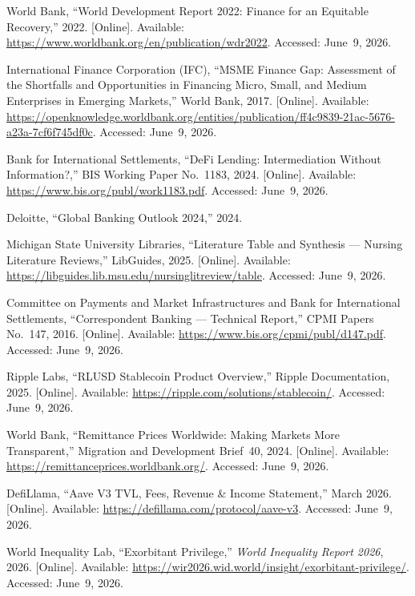 \documentclass[12pt,a4paper]{report}
\begin{document}
{\begin{enumerate}[label={[\arabic*]}]
\item World Bank, ``World Development Report 2022: Finance for an Equitable Recovery,'' 2022. [Online]. Available: \url{https://www.worldbank.org/en/publication/wdr2022}. Accessed: June~9, 2026.

\item International Finance Corporation (IFC), ``MSME Finance Gap: Assessment of the Shortfalls and Opportunities in Financing Micro, Small, and Medium Enterprises in Emerging Markets,'' World Bank, 2017. [Online]. Available: \url{https://openknowledge.worldbank.org/entities/publication/ff4c9839-21ac-5676-a23a-7cf6f745df0c}. Accessed: June~9, 2026.
\item Bank for International Settlements, ``DeFi Lending: Intermediation Without Information?,'' BIS Working Paper No.~1183, 2024. [Online]. Available: \url{https://www.bis.org/publ/work1183.pdf}. Accessed: June~9, 2026.

\item Deloitte, ``Global Banking Outlook 2024,'' 2024.

\item Michigan State University Libraries, ``Literature Table and Synthesis --- Nursing Literature Reviews,'' LibGuides, 2025. [Online]. Available: \url{https://libguides.lib.msu.edu/nursinglitreview/table}. Accessed: June~9, 2026.

\item Committee on Payments and Market Infrastructures and Bank for International Settlements, ``Correspondent Banking --- Technical Report,'' CPMI Papers No.~147, 2016. [Online]. Available: \url{https://www.bis.org/cpmi/publ/d147.pdf}. Accessed: June~9, 2026.

\item Ripple Labs, ``RLUSD Stablecoin Product Overview,'' Ripple Documentation, 2025. [Online]. Available: \url{https://ripple.com/solutions/stablecoin/}. Accessed: June~9, 2026.
\item World Bank, ``Remittance Prices Worldwide: Making Markets More Transparent,'' Migration and Development Brief~40, 2024. [Online]. Available: \url{https://remittanceprices.worldbank.org/}. Accessed: June~9, 2026.

\item DefiLlama, ``Aave V3 TVL, Fees, Revenue \& Income Statement,'' March 2026. [Online]. Available: \url{https://defillama.com/protocol/aave-v3}. Accessed: June~9, 2026.

\item World Inequality Lab, ``Exorbitant Privilege,'' \textit{World Inequality Report 2026}, 2026. [Online]. Available: \url{https://wir2026.wid.world/insight/exorbitant-privilege/}. Accessed: June~9, 2026.


\end{enumerate}}
\end{document}
